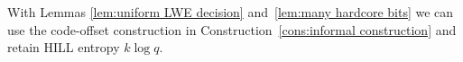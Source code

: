 \documentclass[11pt]{article}
\newcommand{\lemref}[1]{\mbox{Lemma~\ref{#1}}}
\newcommand{\consref}[1]{\mbox{Construction~\ref{#1}}}
\newcommand{\class}[1]{{\ensuremath{\mathsf{#1}}}}
\newcommand{\vect}[1]{\ensuremath{\textbf{#1}}}
\newcommand{\Fq}{\ensuremath{\mathbb{F}_q}}
\newcommand{\unp}{\ensuremath{\mathtt{unp}}\xspace}
\newcommand{\poly}{\ensuremath{\mathtt{poly}}\xspace}
\newcommand{\ngl}{\ensuremath{\mathtt{ngl}}\xspace}
\newcommand{\distLWE}{\ensuremath{\class{dist\mbox{-}LWE}}}
\newtheorem{lemma}[theorem]{Lemma}
\newcommand{\vA}{\vect{A}}
\begin{document}
With Lemmas \ref{lem:uniform LWE decision} and~\ref{lem:many hardcore bits} we can use the code-offset construction in \consref{cons:informal construction} and retain HILL entropy $k\log q$.  
\end{document}
